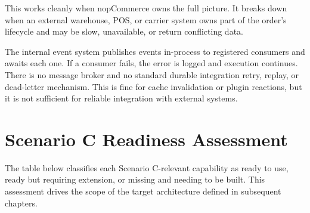 This works cleanly when nopCommerce owns the full picture. It breaks down when an external
warehouse, POS, or carrier system owns part of the order's lifecycle and may be slow,
unavailable, or return conflicting data.

The internal event system publishes events in-process to registered consumers and awaits each
one. If a consumer fails, the error is logged and execution continues. There is no message
broker and no standard durable integration retry, replay, or dead-letter mechanism. This is
fine for cache invalidation or plugin reactions, but it is not sufficient for reliable
integration with external systems.

\section{Scenario C Readiness Assessment}

The table below classifies each Scenario C-relevant capability as ready to use, ready but
requiring extension, or missing and needing to be built. This assessment drives the scope of
the target architecture defined in subsequent chapters.

